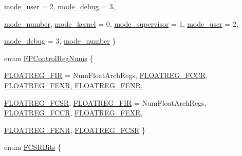 \begin{DoxyCompactItemize}
\hyperlink{namespaceMipsISA_a19269c193c0c4866cdc4e5abd433f9fca7f68981a5aa91b746361d036f7e44f50}{mode\_\-user} =  2, 
\hyperlink{namespaceMipsISA_a19269c193c0c4866cdc4e5abd433f9fca8dadb017a33541c825091bafb0339e4c}{mode\_\-debug} =  3, 
\par
\hyperlink{namespaceMipsISA_a19269c193c0c4866cdc4e5abd433f9fcaf97df9db0535ca522f7b8d2a6fa203f4}{mode\_\-number}, 
\hyperlink{namespaceMipsISA_a19269c193c0c4866cdc4e5abd433f9fcaf9ca40d36bda60aea728f69a10a455a1}{mode\_\-kernel} =  0, 
\hyperlink{namespaceMipsISA_a19269c193c0c4866cdc4e5abd433f9fcab3d3f3b4766251166f2c8057fa484f19}{mode\_\-supervisor} =  1, 
\hyperlink{namespaceMipsISA_a19269c193c0c4866cdc4e5abd433f9fca7f68981a5aa91b746361d036f7e44f50}{mode\_\-user} =  2, 
\par
\hyperlink{namespaceMipsISA_a19269c193c0c4866cdc4e5abd433f9fca8dadb017a33541c825091bafb0339e4c}{mode\_\-debug} =  3, 
\hyperlink{namespaceMipsISA_a19269c193c0c4866cdc4e5abd433f9fcaf97df9db0535ca522f7b8d2a6fa203f4}{mode\_\-number}
 \}
\item 
enum \hyperlink{namespaceMipsISA_a5c25eb02ee099af970c3b8d2e4f5dc43}{FPControlRegNums} \{ \par
\hyperlink{namespaceMipsISA_a5c25eb02ee099af970c3b8d2e4f5dc43a3b749b1d9b33241fa39082cd47a5401e}{FLOATREG\_\-FIR} =  NumFloatArchRegs, 
\hyperlink{namespaceMipsISA_a5c25eb02ee099af970c3b8d2e4f5dc43a41a9157321aeb48a256911179ea15bd1}{FLOATREG\_\-FCCR}, 
\hyperlink{namespaceMipsISA_a5c25eb02ee099af970c3b8d2e4f5dc43a333c1e7b14ba5577023b0ab300c443ae}{FLOATREG\_\-FEXR}, 
\hyperlink{namespaceMipsISA_a5c25eb02ee099af970c3b8d2e4f5dc43a63e4bfba7a5762656f4d1690d816175d}{FLOATREG\_\-FENR}, 
\par
\hyperlink{namespaceMipsISA_a5c25eb02ee099af970c3b8d2e4f5dc43afb4cd967061a283e84d18cfc4e8a5a7b}{FLOATREG\_\-FCSR}, 
\hyperlink{namespaceMipsISA_a5c25eb02ee099af970c3b8d2e4f5dc43a3b749b1d9b33241fa39082cd47a5401e}{FLOATREG\_\-FIR} =  NumFloatArchRegs, 
\hyperlink{namespaceMipsISA_a5c25eb02ee099af970c3b8d2e4f5dc43a41a9157321aeb48a256911179ea15bd1}{FLOATREG\_\-FCCR}, 
\hyperlink{namespaceMipsISA_a5c25eb02ee099af970c3b8d2e4f5dc43a333c1e7b14ba5577023b0ab300c443ae}{FLOATREG\_\-FEXR}, 
\par
\hyperlink{namespaceMipsISA_a5c25eb02ee099af970c3b8d2e4f5dc43a63e4bfba7a5762656f4d1690d816175d}{FLOATREG\_\-FENR}, 
\hyperlink{namespaceMipsISA_a5c25eb02ee099af970c3b8d2e4f5dc43afb4cd967061a283e84d18cfc4e8a5a7b}{FLOATREG\_\-FCSR}
 \}
\item 
enum \hyperlink{namespaceMipsISA_a79915055f9ee1b5f815a7998dbc159f7}{FCSRBits} \{ \par

\end{DoxyCompactItemize}
